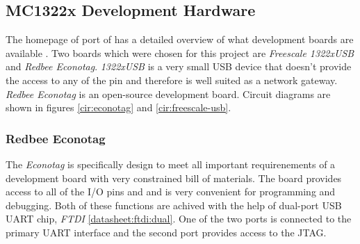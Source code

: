  

\subsection{MC1322x Development Hardware}

  The homepage of  port of \contiki has a detailed
 overview of what development boards are available \cite{homepage:mc1322x:hw}.
 Two boards which were chosen for this project are \emph{Freescale
 1322xUSB} and \emph{Redbee Econotag}.
 \emph{1322xUSB} is a very small USB device that doesn't provide the
 access to any of the pin and therefore is well suited as a network
 gateway. \emph{Redbee Econotag} is an open-source development board.
  Circuit diagrams are shown in figures \ref{cir:econotag} and 
 \ref{cir:freescale-usb}.

\subsubsection{Redbee Econotag}

  The \emph{Econotag} is specifically design to meet all important
 requirenements of a development board with very constrained bill of
 materials. The board provides access to all of the I/O pins and
 and is very convenient for programming and debugging. Both of these
 functions are achived with the help of dual-port USB UART chip,
 \emph{FTDI}  \ref{datasheet:ftdi:dual}. One of the two
 ports is connected to the primary UART interface and the second port
 provides access to the JTAG.

 
